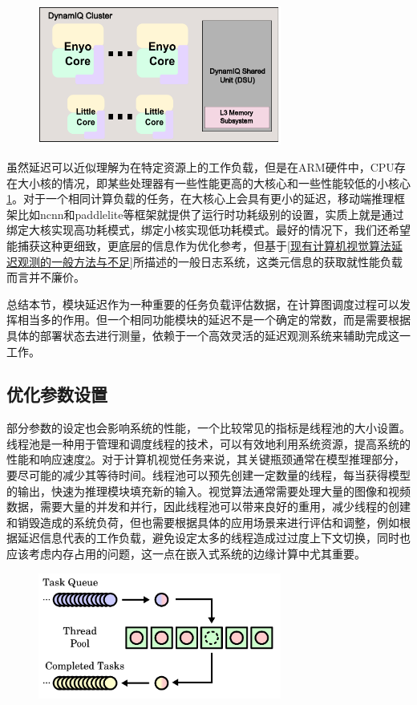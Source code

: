 \documentclass[master,anonymous]{shtthesis}
\begin{document}
\begin{figure}[H]
	\centering
	\includegraphics[width=8cm]{img/arm.pdf}
	\label{ARM的大小核架构}
\end{figure}

虽然延迟可以近似理解为在特定资源上的工作负载，但是在ARM硬件中，CPU存在大小核的情况，即某些处理器有一些性能更高的大核心和一些性能较低的小核心\ref{ARM的大小核架构}。对于一个相同计算负载的任务，在大核心上会具有更小的延迟，移动端推理框架比如ncnn和paddlelite等框架\cite{febvay2020low}就提供了运行时功耗级别的设置，实质上就是通过绑定大核实现高功耗模式，绑定小核实现低功耗模式。最好的情况下，我们还希望能捕获这种更细致，更底层的信息作为优化参考，但基于\ref{现有计算机视觉算法延迟观测的一般方法与不足}所描述的一般日志系统，这类元信息的获取就性能负载而言并不廉价。

总结本节，模块延迟作为一种重要的任务负载评估数据，在计算图调度过程可以发挥相当多的作用。但一个相同功能模块的延迟不是一个确定的常数，而是需要根据具体的部署状态去进行测量，依赖于一个高效灵活的延迟观测系统来辅助完成这一工作。

\subsection{优化参数设置}\label{优化参数设置}
部分参数的设定也会影响系统的性能，一个比较常见的指标是线程池的大小设置。线程池是一种用于管理和调度线程的技术，可以有效地利用系统资源，提高系统的性能和响应速度\ref{线程池的工作过程}。对于计算机视觉任务来说，其关键瓶颈通常在模型推理部分，要尽可能的减少其等待时间。线程池可以预先创建一定数量的线程，每当获得模型的输出，快速为推理模块填充新的输入。视觉算法通常需要处理大量的图像和视频数据，需要大量的并发和并行，因此线程池可以带来良好的重用，减少线程的创建和销毁造成的系统负荷，但也需要根据具体的应用场景来进行评估和调整，例如根据延迟信息代表的工作负载，避免设定太多的线程造成过过度上下文切换，同时也应该考虑内存占用的问题，这一点在嵌入式系统的边缘计算中尤其重要\cite{threadpool}。

\begin{figure}[htbp]
	\centering
	\includegraphics[width=8cm]{img/thread_pool.pdf}
	\label{线程池的工作过程}
\end{figure}
\end{document}
